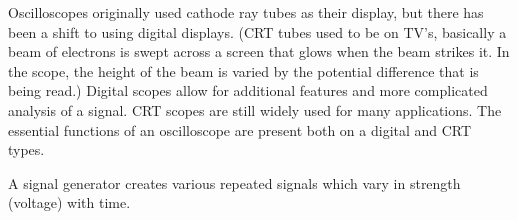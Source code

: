 \documentclass[onecolumn]{article}
\begin{document}



\noindent Oscilloscopes originally used cathode ray tubes as their display, but there has been a shift to using digital displays. (CRT tubes used to be on TV's, basically a beam of electrons is swept across a screen that glows when the beam strikes it. In the scope, the height of the beam is varied by the potential difference that is being read.) Digital scopes allow for additional features and more complicated analysis of a signal. CRT scopes are still widely used for many applications.  The essential functions of an oscilloscope are present both on a digital and CRT types. 

A signal generator creates various repeated signals which vary in strength (voltage) with time. 
\end{document}
